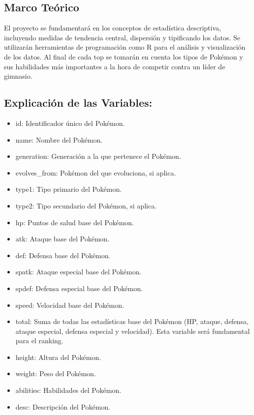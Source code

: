 \documentclass[
]{article}
\providecommand{\tightlist}{%
  \setlength{\itemsep}{0pt}\setlength{\parskip}{0pt}}
\begin{document}
\subsection{Marco Teórico}\label{marco-teuxf3rico}

El proyecto se fundamentará en los conceptos de estadística descriptiva,
incluyendo medidas de tendencia central, dispersión y tipificando los
datos. Se utilizarán herramientas de programación como R para el
análisis y visualización de los datos. Al final de cada top se tomarán
en cuenta los tipos de Pokémon y sus habilidades más importantes a la
hora de competir contra un líder de gimnasio.

\subsection{Explicación de las
Variables:}\label{explicaciuxf3n-de-las-variables}

\begin{itemize}
\tightlist
\item
  id: Identificador único del Pokémon.
\item
  name: Nombre del Pokémon.
\item
  generation: Generación a la que pertenece el Pokémon.
\item
  evolves\_from: Pokémon del que evoluciona, si aplica.
\item
  type1: Tipo primario del Pokémon.
\item
  type2: Tipo secundario del Pokémon, si aplica.
\item
  hp: Puntos de salud base del Pokémon.
\item
  atk: Ataque base del Pokémon.
\item
  def: Defensa base del Pokémon.
\item
  spatk: Ataque especial base del Pokémon.
\item
  spdef: Defensa especial base del Pokémon.
\item
  speed: Velocidad base del Pokémon.
\item
  total: Suma de todas las estadísticas base del Pokémon (HP, ataque,
  defensa, ataque especial, defensa especial y velocidad). Esta variable
  será fundamental para el ranking.
\item
  height: Altura del Pokémon.
\item
  weight: Peso del Pokémon.
\item
  abilities: Habilidades del Pokémon.
\item
  desc: Descripción del Pokémon.
\end{itemize}
\end{document}
